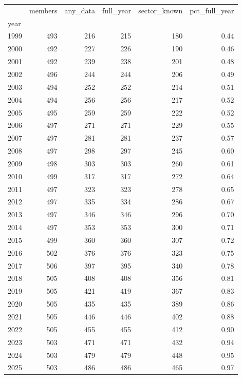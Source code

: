 \begin{tabular}{lrrrrr}
\toprule
 & members & any_data & full_year & sector_known & pct_full_year \\
year &  &  &  &  &  \\
\midrule
1999 & 493 & 216 & 215 & 180 & 0.44 \\
2000 & 492 & 227 & 226 & 190 & 0.46 \\
2001 & 492 & 239 & 238 & 201 & 0.48 \\
2002 & 496 & 244 & 244 & 206 & 0.49 \\
2003 & 494 & 252 & 252 & 214 & 0.51 \\
2004 & 494 & 256 & 256 & 217 & 0.52 \\
2005 & 495 & 259 & 259 & 222 & 0.52 \\
2006 & 497 & 271 & 271 & 229 & 0.55 \\
2007 & 497 & 281 & 281 & 237 & 0.57 \\
2008 & 497 & 298 & 297 & 245 & 0.60 \\
2009 & 498 & 303 & 303 & 260 & 0.61 \\
2010 & 499 & 317 & 317 & 272 & 0.64 \\
2011 & 497 & 323 & 323 & 278 & 0.65 \\
2012 & 497 & 335 & 334 & 286 & 0.67 \\
2013 & 497 & 346 & 346 & 296 & 0.70 \\
2014 & 497 & 353 & 353 & 300 & 0.71 \\
2015 & 499 & 360 & 360 & 307 & 0.72 \\
2016 & 502 & 376 & 376 & 323 & 0.75 \\
2017 & 506 & 397 & 395 & 340 & 0.78 \\
2018 & 505 & 408 & 408 & 356 & 0.81 \\
2019 & 505 & 421 & 419 & 367 & 0.83 \\
2020 & 505 & 435 & 435 & 389 & 0.86 \\
2021 & 505 & 446 & 446 & 402 & 0.88 \\
2022 & 505 & 455 & 455 & 412 & 0.90 \\
2023 & 503 & 471 & 471 & 432 & 0.94 \\
2024 & 503 & 479 & 479 & 448 & 0.95 \\
2025 & 503 & 486 & 486 & 465 & 0.97 \\
\bottomrule
\end{tabular}
